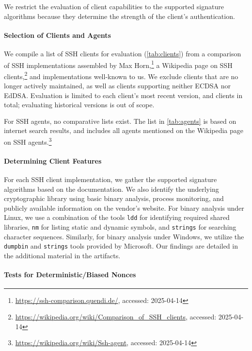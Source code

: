 We restrict the evaluation of client capabilities to the supported signature algorithms because they determine the strength of the client's authentication.

\paragraph{Selection of Clients and Agents}

We compile a list of SSH clients for evaluation (\autoref{tab:clients}) from a comparison of SSH implementations assembled by Max Horn,\footnote{\url{https://ssh-comparison.quendi.de/}, accessed: 2025-04-14} a Wikipedia page on SSH clients,\footnote{\url{https://wikipedia.org/wiki/Comparison_of_SSH_clients}, accessed: 2025-04-14} and implementations well-known to us. We exclude clients that are no longer actively maintained, as well as clients supporting neither ECDSA nor EdDSA. Evaluation is limited to each client's most recent version, and \nrClients clients in total; evaluating historical versions is out of scope.

For SSH agents, no comparative lists exist. The list in \autoref{tab:agents} is based on internet search results, and includes all agents mentioned on the Wikipedia page on SSH agents.\footnote{\url{https://wikipedia.org/wiki/Ssh-agent}, accessed: 2025-04-14}

\paragraph{Determining Client Features}

For each SSH client implementation, we gather the supported signature algorithms based on the documentation. We also identify the underlying cryptographic library using basic binary analysis, process monitoring, and publicly available information on the vendor's website. For binary analysis under Linux, we use a combination of the tools \texttt{ldd} for identifying required shared libraries, \texttt{nm} for listing static and dynamic symbols, and \texttt{strings} for searching character sequences. Similarly, for binary analysis under Windows, we utilize the \texttt{dumpbin} and \texttt{strings} tools provided by Microsoft. Our findings are detailed in the additional material in the artifacts.

\label{sec:detnoncetest}
\paragraph{Tests for Deterministic/Biased Nonces}

